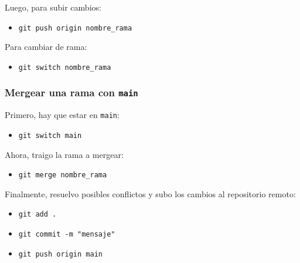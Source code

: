 \documentclass{article} %
\begin{document}
Luego, para subir cambios:

\begin{itemize}
    \item \texttt{git push origin nombre\_rama}
\end{itemize}

Para cambiar de rama:

\begin{itemize}
    \item \texttt{git switch nombre\_rama}
\end{itemize}

\subsubsection{Mergear una rama con \texttt{main}}

Primero, hay que estar en \texttt{main}:

\begin{itemize}
    \item \texttt{git switch main}
\end{itemize}

Ahora, traigo la rama a mergear:

\begin{itemize}
    \item \texttt{git merge nombre\_rama}
\end{itemize}

Finalmente, resuelvo posibles conflictos y subo los cambios al repositorio remoto:

\begin{itemize}
    \item \texttt{git add .}
    \item \texttt{git commit -m "mensaje"}
    \item \texttt{git push origin main}
\end{itemize}
\end{document}
